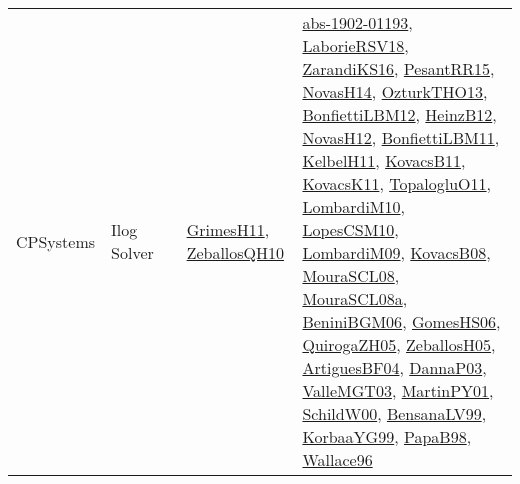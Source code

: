 {\begin{longtable}{lp{3cm}>{\raggedright}p{6cm}>{\raggedright}p{6cm}p{8cm}}
CPSystems & Ilog Solver &  & \href{papers/GrimesH11.pdf}{GrimesH11}\cite{GrimesH11}, \href{articles/ZeballosQH10.pdf}{ZeballosQH10}\cite{ZeballosQH10} & \href{articles/abs-1902-01193.pdf}{abs-1902-01193}\cite{abs-1902-01193}, \href{articles/LaborieRSV18.pdf}{LaborieRSV18}\cite{LaborieRSV18}, \href{articles/ZarandiKS16.pdf}{ZarandiKS16}\cite{ZarandiKS16}, \href{papers/PesantRR15.pdf}{PesantRR15}\cite{PesantRR15}, \href{articles/NovasH14.pdf}{NovasH14}\cite{NovasH14}, \href{articles/OzturkTHO13.pdf}{OzturkTHO13}\cite{OzturkTHO13}, \href{papers/BonfiettiLBM12.pdf}{BonfiettiLBM12}\cite{BonfiettiLBM12}, \href{papers/HeinzB12.pdf}{HeinzB12}\cite{HeinzB12}, \href{articles/NovasH12.pdf}{NovasH12}\cite{NovasH12}, \href{papers/BonfiettiLBM11.pdf}{BonfiettiLBM11}\cite{BonfiettiLBM11}, \href{articles/KelbelH11.pdf}{KelbelH11}\cite{KelbelH11}, \href{articles/KovacsB11.pdf}{KovacsB11}\cite{KovacsB11}, \href{articles/KovacsK11.pdf}{KovacsK11}\cite{KovacsK11}, \href{articles/TopalogluO11.pdf}{TopalogluO11}\cite{TopalogluO11}, \href{papers/LombardiM10.pdf}{LombardiM10}\cite{LombardiM10}, \href{articles/LopesCSM10.pdf}{LopesCSM10}\cite{LopesCSM10}, \href{papers/LombardiM09.pdf}{LombardiM09}\cite{LombardiM09}, \href{articles/KovacsB08.pdf}{KovacsB08}\cite{KovacsB08}, \href{papers/MouraSCL08.pdf}{MouraSCL08}\cite{MouraSCL08}, \href{papers/MouraSCL08a.pdf}{MouraSCL08a}\cite{MouraSCL08a}, \href{papers/BeniniBGM06.pdf}{BeniniBGM06}\cite{BeniniBGM06}, \href{papers/GomesHS06.pdf}{GomesHS06}\cite{GomesHS06}, \href{papers/QuirogaZH05.pdf}{QuirogaZH05}\cite{QuirogaZH05}, \href{articles/ZeballosH05.pdf}{ZeballosH05}\cite{ZeballosH05}, \href{papers/ArtiguesBF04.pdf}{ArtiguesBF04}\cite{ArtiguesBF04}, \href{papers/DannaP03.pdf}{DannaP03}\cite{DannaP03}, \href{papers/ValleMGT03.pdf}{ValleMGT03}\cite{ValleMGT03}, \href{articles/MartinPY01.pdf}{MartinPY01}\cite{MartinPY01}, \href{articles/SchildW00.pdf}{SchildW00}\cite{SchildW00}, \href{articles/BensanaLV99.pdf}{BensanaLV99}\cite{BensanaLV99}, \href{papers/KorbaaYG99.pdf}{KorbaaYG99}\cite{KorbaaYG99}, \href{articles/PapaB98.pdf}{PapaB98}\cite{PapaB98}, \href{articles/Wallace96.pdf}{Wallace96}\cite{Wallace96}\\

\end{longtable}}
